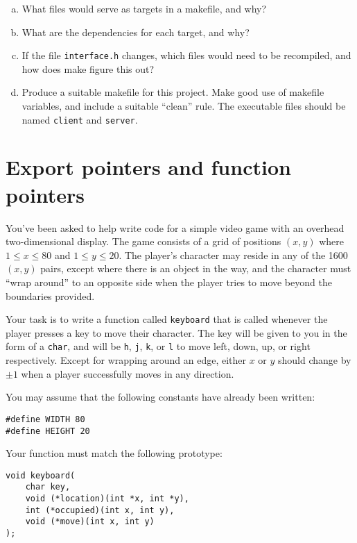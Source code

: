 \documentclass[a4paper,12pt]{article}
\begin{document}
\begin{enumerate}[a)]
	\item What files would serve as targets in a makefile, and why?
	\item What are the dependencies for each target, and why?
	\item If the file \texttt{interface.h} changes, which files
	      would need to be recompiled, and how does make figure
	      this out?
	\item Produce a suitable makefile for this project. Make good
	      use of makefile variables, and include a suitable
	      “clean” rule. The executable files should be named
	      \texttt{client} and \texttt{server}.
\end{enumerate}

\newpage

\section{Export pointers and function pointers}

You’ve been asked to help write code for a simple video game with an
overhead two-dimensional display. The game consists of a grid of
positions $(x, y)$ where $1 \leq x \leq 80$ and $1 \leq y \leq 20$.
The player’s character may reside in any of the 1600 $(x, y)$ pairs,
except where there is an object in the way, and the character must
“wrap around” to an opposite side when the player tries to move beyond
the boundaries provided.

Your task is to write a function called \texttt{keyboard} that is
called whenever the player presses a key to move their character. The
key will be given to you in the form of a \texttt{char}, and will be
\texttt{\textquotesingle{}h\textquotesingle},
\texttt{\textquotesingle{}j\textquotesingle},
\texttt{\textquotesingle{}k\textquotesingle}, or
\texttt{\textquotesingle{}l\textquotesingle} to move left, down, up, or
right respectively. Except for wrapping around an edge, either $x$ or
$y$ should change by $\pm 1$ when a player successfully moves in any
direction.

You may assume that the following constants have already been written:

\begin{lstlisting}
#define WIDTH 80
#define HEIGHT 20
\end{lstlisting}

Your function must match the following prototype:

\begin{lstlisting}
void keyboard(
	char key,
	void (*location)(int *x, int *y),
	int (*occupied)(int x, int y),
	void (*move)(int x, int y)
);
\end{lstlisting}
\end{document}
